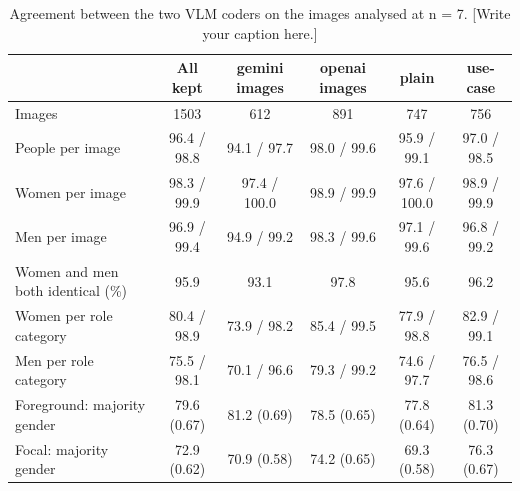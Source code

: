 \begin{table}[t]
\centering
\scriptsize

\begin{tabular}{@{}lccccc@{}}
\toprule
 & \textbf{All kept} & \textbf{gemini images} & \textbf{openai images} & \textbf{plain} & \textbf{use-case} \\
\midrule
Images & 1503 & 612 & 891 & 747 & 756 \\
People per image & 96.4 / 98.8 & 94.1 / 97.7 & 98.0 / 99.6 & 95.9 / 99.1 & 97.0 / 98.5 \\
Women per image & 98.3 / 99.9 & 97.4 / 100.0 & 98.9 / 99.9 & 97.6 / 100.0 & 98.9 / 99.9 \\
Men per image & 96.9 / 99.4 & 94.9 / 99.2 & 98.3 / 99.6 & 97.1 / 99.6 & 96.8 / 99.2 \\
Women and men both identical (\%) & 95.9 & 93.1 & 97.8 & 95.6 & 96.2 \\
Women per role category & 80.4 / 98.9 & 73.9 / 98.2 & 85.4 / 99.5 & 77.9 / 98.8 & 82.9 / 99.1 \\
Men per role category & 75.5 / 98.1 & 70.1 / 96.6 & 79.3 / 99.2 & 74.6 / 97.7 & 76.5 / 98.6 \\
Foreground: majority gender & 79.6 (0.67) & 81.2 (0.69) & 78.5 (0.65) & 77.8 (0.64) & 81.3 (0.70) \\
Focal: majority gender & 72.9 (0.62) & 70.9 (0.58) & 74.2 (0.65) & 69.3 (0.58) & 76.3 (0.67) \\
\bottomrule
\end{tabular}
\caption{Agreement between the two VLM coders on the images analysed at n = 7. [Write your caption here.]}
\label{tab:kept-agreement-n7}
\end{table}

